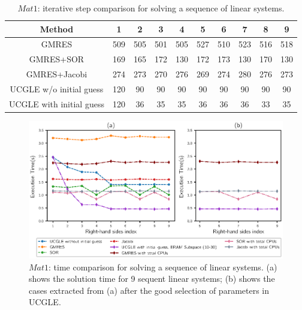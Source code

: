 \begin{table}[htbp]
	\small
	\label{tb1}
	\caption{$Mat1$: iterative step comparison for solving a sequence of linear systems.}
	\centering
	\renewcommand{\arraystretch}{1.6}
	\begin{tabular}{c*{9}{c}}
		\toprule
			\cellcolor{gray!50}Method              & \cellcolor{gray!50}1 &  \cellcolor{gray!50}2 &  \cellcolor{gray!50}3 &  \cellcolor{gray!50}4 &  \cellcolor{gray!50}5  &  \cellcolor{gray!50}6  & \cellcolor{gray!50}7 & \cellcolor{gray!50}8 & \cellcolor{gray!50}9\\
		\midrule
		GMRES & 509 & 505 & 501 & 505 & 527 & 510  &523&516& 518\\
			\cellcolor{gray!20}GMRES+SOR            & 	\cellcolor{gray!20}169 & 	\cellcolor{gray!20}165 & 	\cellcolor{gray!20}172 & 	\cellcolor{gray!20}130 & 	\cellcolor{gray!20}172 & 	\cellcolor{gray!20}173 &	\cellcolor{gray!20}130&	\cellcolor{gray!20}170&	\cellcolor{gray!20}130\\
		GMRES+Jacobi            & 274 & 273 & 270 & 276 & 269 & 274 &280&276&273\\
			\cellcolor{gray!20}UCGLE w/o initial guess     & 	\cellcolor{gray!20}120 & 	\cellcolor{gray!20}90 & 	\cellcolor{gray!20}90 & 	\cellcolor{gray!20}90 & 	\cellcolor{gray!20}90 &	\cellcolor{gray!20}90 &	\cellcolor{gray!20}90&	\cellcolor{gray!20}90& 	\cellcolor{gray!20}90\\
		UCGLE with initial guess     & 120 & 36 & 35 & 35 & 36 &36  &36&33&35\\
		\hline
	\end{tabular}
\end{table}

\begin{figure}
	\centering
	\includegraphics[width=6.4in]{fig/seqrhs1.eps}
	\caption{$Mat1$: time comparison for solving a sequence of linear systems. (a) shows the solution time for 9 sequent linear systems; (b) shows the cases extracted from (a) after the good selection of parameters in UCGLE.}
	\label{fig:seqrhs1}
\end{figure}

